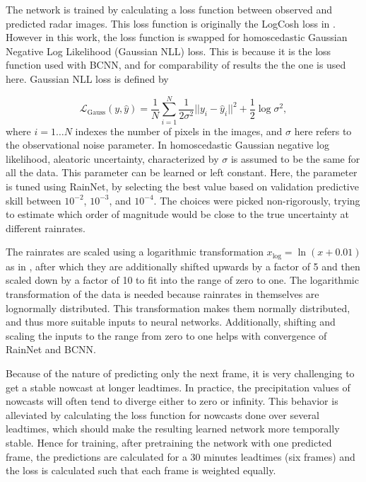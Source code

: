 The network is trained by calculating a loss function between observed and predicted radar images. This loss function is originally the LogCosh loss in \citet{ayzel_rainnet_nodate}. However in this work, the loss function is swapped for homoscedastic Gaussian Negative Log Likelihood (Gaussian NLL) loss. This is because it is the loss function used with BCNN, and for comparability of results the the one is used here. Gaussian NLL loss \cite{kendall_what_2017} is defined by 

\begin{equation}
\mathcal{L}_\text{Gauss}(y, \hat{y}) = \frac{1}{N} \sum_{i=1}^{N} \frac{1}{2\sigma^2}||y_i - \hat{y}_i||^2 
+ \frac{1}{2} \log \sigma^2,
\end{equation}
%
where $i = 1 \dots N$ indexes the number of pixels in the images, and $\sigma$ here refers to the observational noise parameter. In homoscedastic Gaussian negative log likelihood, aleatoric uncertainty, characterized by $\sigma$ is assumed to be the same for all the data. This parameter can be learned or left constant. Here, the parameter is tuned using RainNet, by selecting the best value based on validation predictive skill between $10^{-2}$, $10^{-3}$, and $10^{-4}$. The choices were picked non-rigorously, trying to estimate which order of magnitude would be close to the true uncertainty at different rainrates.

The rainrates are scaled using a logarithmic transformation $x_{\log} = \ln(x + 0.01)$ as in \citet{ayzel_rainnet_nodate}, after which they are additionally shifted upwards by a factor of 5 and then scaled down by a factor of 10 to fit into the range of zero to one. The logarithmic transformation of the data is needed because rainrates in themselves are lognormally distributed. This transformation makes them normally distributed, and thus more suitable inputs to neural networks. Additionally, shifting and scaling the inputs to the range from zero to one helps with convergence of RainNet and BCNN. 

Because of the nature of predicting only the next frame, it is very challenging to get a stable nowcast at longer leadtimes. In practice, the precipitation values of nowcasts will often tend to diverge either to zero or infinity. This behavior is alleviated by calculating the loss function for nowcasts done over several leadtimes, which should make the resulting learned network more temporally stable. Hence for training, after pretraining the network with one predicted frame, the predictions are calculated for a 30 minutes leadtimes (six frames) and the loss is calculated such that each frame is weighted equally. 

